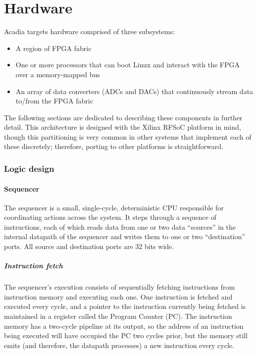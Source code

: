\part{Hardware}

Acadia targets hardware comprised of three subsystems:

\begin{itemize}
  \item A region of FPGA fabric
  \item One or more processors that can boot Linux and interact with the FPGA over a memory-mapped bus 
  \item An array of data converters (ADCs and DACs) that continuously stream data to/from the FPGA fabric
\end{itemize}  

The following sections are dedicated to describing these components in further detail. This architecture is designed with the Xilinx RFSoC platform in mind, though this partitioning is very common in other systems that implement each of these discretely; therefore, porting to other platforms is straightforward.

\section{Logic design}

\subsection{Sequencer}

The sequencer is a small, single-cycle, deterministic CPU responsible for coordinating actions across the system. It steps through a sequence of instructions, each of which reads data from one or two data ``sources'' in the internal datapath of the sequencer and writes them to one or two ``destination'' ports. All source and destination ports are 32 bits wide.

\subsubsection{Instruction fetch}

The sequencer's execution consists of sequentially fetching instructions from instruction memory and executing each one. One instruction is fetched and executed every cycle, and a pointer to the instruction currently being fetched is maintained in a register called the Program Counter (PC). The instruction memory has a two-cycle pipeline at its output, so the address of an instruction being executed will have occupied the PC two cycles prior, but the memory still emits (and therefore, the datapath processes) a new instruction every cycle.

